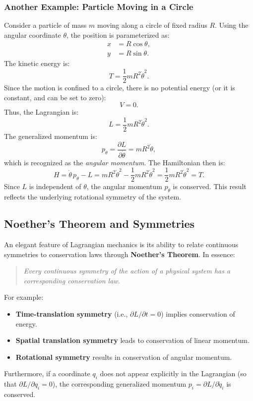 \subsubsection{Another Example: Particle Moving in a Circle}

Consider a particle of mass $m$ moving along a circle of fixed radius $R$. Using the angular coordinate $\theta$, the position is parameterized as:
\begin{align}
    x & = R\cos\theta, \\
    y & = R\sin\theta.
\end{align}
The kinetic energy is:
\begin{equation}
    T = \frac{1}{2}mR^2\dot{\theta}^2.
\end{equation}
Since the motion is confined to a circle, there is no potential energy (or it is constant, and can be set to zero):
\begin{equation}
    V = 0.
\end{equation}
Thus, the Lagrangian is:
\begin{equation}
    L = \frac{1}{2}mR^2\dot{\theta}^2.
\end{equation}
The generalized momentum is:
\begin{equation}
    p_\theta = \frac{\partial L}{\partial \dot{\theta}} = mR^2\dot{\theta},
\end{equation}
which is recognized as the \emph{angular momentum}. The Hamiltonian then is:
\begin{equation}
    H = \dot{\theta}\,p_\theta - L = mR^2\dot{\theta}^2 - \frac{1}{2}mR^2\dot{\theta}^2 = \frac{1}{2}mR^2\dot{\theta}^2 = T.
\end{equation}
Since $L$ is independent of $\theta$, the angular momentum $p_\theta$ is conserved. This result reflects the underlying rotational symmetry of the system.

\subsection{Noether's Theorem and Symmetries}

An elegant feature of Lagrangian mechanics is its ability to relate continuous symmetries to conservation laws through \textbf{Noether's Theorem}. In essence:
\begin{quotation}
    \emph{Every continuous symmetry of the action of a physical system has a corresponding conservation law.}
\end{quotation}
For example:
\begin{itemize}
    \item \textbf{Time-translation symmetry} (i.e., $\partial L/\partial t = 0$) implies conservation of energy.
    \item \textbf{Spatial translation symmetry} leads to conservation of linear momentum.
    \item \textbf{Rotational symmetry} results in conservation of angular momentum.
\end{itemize}
Furthermore, if a coordinate $q_i$ does not appear explicitly in the Lagrangian (so that $\partial L/\partial q_i = 0$), the corresponding generalized momentum $p_i = \partial L/\partial \dot{q}_i$ is conserved.
